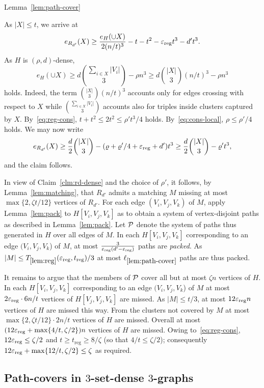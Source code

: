 \documentclass[11pt,reqno]{amsart}
\def\reg{\mathrm{reg}}
\def\pcref{\mathrm{\ref{lem:path-cover}}}
\def\regref{\mathrm{\ref{lem:reg}}}
\begin{document}
\begin{proofof}{Lemma~\ref{lem:path-cover}}
\begin{innerproof}
As $|X| \leq t$, we arrive at 
\begin{align*}
e_{R_{d'}}(X) \geq \frac{e_H(\cup X)}{2(n/t)^3} - t - t^2 - \eps_{\reg}t^3 -d' t^3.
\end{align*}
As $H$ is $(\rho,d)$-dense, 
$$
e_H(\cup X) \geq d \binom{\sum_{i \in X} |V_i|}{3} - \rho n^3 \geq d\binom{|X|}{3} (n/t)^3 - \rho n^3
$$
holds. Indeed, the term $\binom{|X|}{3} (n/t)^3$ accounts only for edges crossing with respect to $X$ while $\binom{\sum_{i \in X} |V_i|}{3}$ accounts also for triples inside clusters captured by $X$.
By~\eqref{eq:reg-cons}, $t+t^2 \leq 2 t^2 \leq \rho' t^3 /4$ holds. By~\eqref{eq:cons-local}, $\rho \leq \rho'/4$ holds. We may now write   
$$
e_{R_{d'}}(X) \geq \frac{d}{2} \binom{|X|}{3} - (\rho +\rho'/4 + \eps_{\reg} + d')t^3 \geq \frac{d}{2} \binom{|X|}{3} - \rho' t^3,
$$
and the claim follows.
\end{innerproof}


In view of Claim~\ref{clm:rd-dense} and the choice of $\rho'$, it follows, by Lemma~\ref{lem:matching}, that $R_{d'}$ admits a matching $M$ missing at most $\max\{2,\zeta t /12\}$ vertices of $R_{d'}$. For each edge $(V_i,V_j,V_k)$ of $M$, apply Lemma~\ref{lem:pack} to $H[V_i,V_j,V_k]$ as to obtain a system of vertex-disjoint paths as described in Lemma~\ref{lem:pack}. Let $\P$ denote the system of paths thus generated in $H$ over all edges of $M$.  
In each $H[V_i,V_j,V_k]$ corresponding to an edge $(V_i,V_j,V_k$) of $M$, at most $\frac{3}{\eps_{\reg}(d'-\eps_{\reg})}$ paths are {\sl packed}. As $|M| \leq T_{\regref}(\eps_{\reg},t_{\reg}) / 3$ at most $\ell_{\pcref}$ paths are thus packed. 

It remains to argue that the members of $\P$ cover all but at most $\zeta n$ vertices of $H$. In each $H[V_i,V_j,V_k]$ corresponding to an edge $(V_i,V_j,V_k$) of $M$ at most $2 \eps_{\reg}\cdot 6 n/t$ vertices of $H[V_j,V_j,V_k]$ are missed. As $|M| \leq t /3$, at most $12\eps_{\reg} n$ vertices of $H$ are missed this way. From the clusters not covered by $M$ at most $\max\{2,\zeta t/12\} \cdot 2 n/t $ vertices of $H$ are missed. Overall at most $(12 \eps_{\reg}+ \max\{4 /t,\zeta/2\})n $ vertices of $H$ are missed. Owing to~\eqref{eq:reg-cons}, $12 \eps_{\reg} \leq \zeta/2$ and $t\geq t_{\reg} \geq 8/ \zeta$ (so that $4 /t \leq \zeta/2$); consequently 
$12 \eps_{\reg}+ \max\{12/t,\zeta/2\} \leq \zeta$ as required.
\end{proofof}

\subsection{Path-covers in $3$-set-dense $3$-graphs}\label{sec:pc-no-reg-points}
\end{document}
